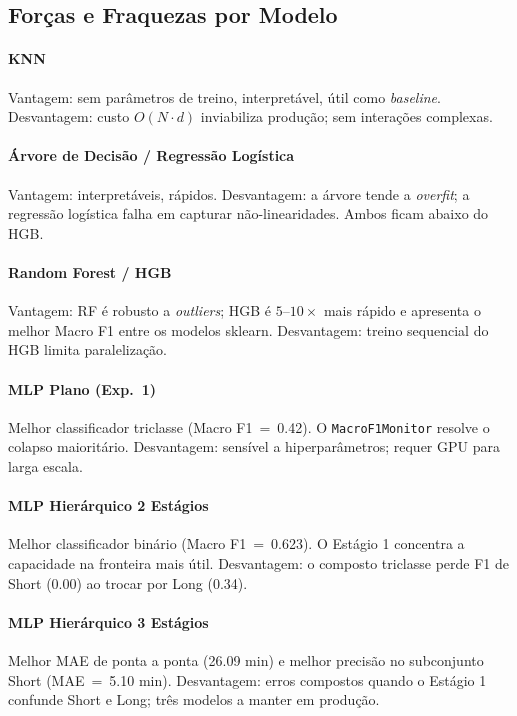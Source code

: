 \documentclass[conference]{IEEEtran}
\begin{document}
\subsection{Forças e Fraquezas por Modelo}

\paragraph{KNN} Vantagem: sem parâmetros de treino, interpretável, útil como
\textit{baseline}. Desvantagem: custo $O(N \cdot d)$ inviabiliza produção; sem
interações complexas.

\paragraph{Árvore de Decisão / Regressão Logística} Vantagem: interpretáveis,
rápidos. Desvantagem: a árvore tende a \textit{overfit}; a regressão logística falha
em capturar não-linearidades. Ambos ficam abaixo do HGB.

\paragraph{Random Forest / HGB} Vantagem: RF é robusto a \textit{outliers};
HGB é $5$–$10\times$ mais rápido e apresenta o melhor Macro F1 entre os modelos sklearn.
Desvantagem: treino sequencial do HGB limita paralelização.

\paragraph{MLP Plano (Exp.~1)} Melhor classificador triclasse (Macro F1~=~0.42).
O \texttt{MacroF1Monitor} resolve o colapso maioritário. Desvantagem: sensível a
hiperparâmetros; requer GPU para larga escala.

\paragraph{MLP Hierárquico 2 Estágios} Melhor classificador binário (Macro F1~=~0.623).
O Estágio 1 concentra a capacidade na fronteira mais útil. Desvantagem: o composto
triclasse perde F1 de Short (0.00) ao trocar por Long (0.34).

\paragraph{MLP Hierárquico 3 Estágios} Melhor MAE de ponta a ponta (26.09 min) e
melhor precisão no subconjunto Short (MAE~=~5.10 min). Desvantagem: erros compostos
quando o Estágio 1 confunde Short e Long; três modelos a manter em produção.
\end{document}
